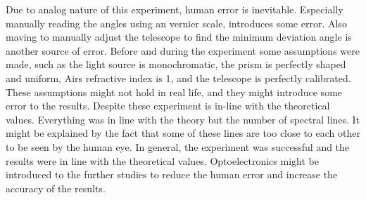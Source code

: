 \documentclass[10pt]{article}
\begin{document}
Due to analog nature of this experiment, human error is inevitable. Especially manually reading the angles using an vernier scale, introduces some error.
Also maving to manually adjust the telescope to find the minimum deviation angle is another source of error.
Before and during the experiment some assumptions were made, such as the light source is monochromatic, the prism is perfectly shaped and uniform, Airs refractive index is 1, and the telescope is perfectly calibrated. These assumptions might not hold in real life, and they might introduce some error to the results.
Despite these experiment is in-line with the theoretical values. Everything was in line with the theory but the number of spectral lines. It might be explained by the fact that some of these lines are too close to each other to be seen by the human eye.
In general, the experiment was successful and the results were in line with the theoretical values. Optoelectronics might be introduced to the further studies to reduce the human error and increase the accuracy of the results. 

\printbibliography
\end{document}
